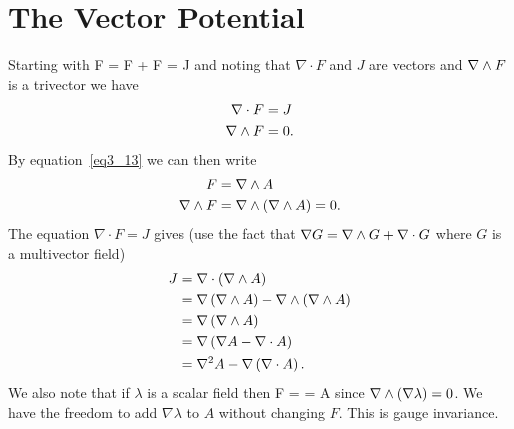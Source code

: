 \section{The Vector Potential}
Starting with
\be
	\nabla F = \nabla\cdot F + \nabla\W F = J
\ee
and noting that $\nabla\cdot F$ and $J$ are vectors and $\nabla\wedge F$ is a trivector we have
\begin{align}
	\nabla\cdot F &= J	\\
	\nabla\wedge F    &= 0.
\end{align}
By equation~\ref{eq3_13} we can then write
\begin{align}
	F &= \nabla\wedge A \\
	\nabla\wedge F &= \nabla\wedge\left ( {\nabla\wedge A} \right ) = 0.	
\end{align}
The equation $\nabla\cdot F = J$ gives (use the fact that $\nabla G = \nabla\wedge G+\nabla\cdot G$ where $G$ is a multivector field)
\begin{align}
	J &= \nabla\cdot\left ( {\nabla\wedge A} \right ) \nonumber \\
	  &= \nabla\left ( {\nabla\wedge A} \right )-\nabla\wedge\left ( {\nabla\wedge A} \right ) \nonumber \\
	  &= \nabla\left ( {\nabla\wedge A} \right ) \nonumber \\
	  &= \nabla\left ( {\nabla A - \nabla\cdot A} \right ) \nonumber \\
	  &= \nabla^{2}A-\nabla\left ( {\nabla\cdot A} \right ).
\end{align}
We also note that if $\lambda$ is a scalar field then
\be
	F = \nabla\W{} = \nabla\W A
\ee
since $\nabla\wedge\left ( {\nabla\lambda} \right ) = 0$.  We have the freedom to add $\nabla\lambda$ to $A$ without changing
$F$.  This is gauge invariance.

